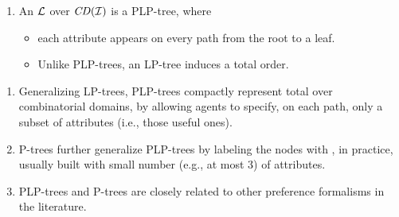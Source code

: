 {
  \begin{enumerate}
    \item An  $\mathcal{L}$ over $\mathit{CD}(\mathcal{I})$ is a PLP-tree, where
    \begin{itemize}
      \item each attribute appears  on every path from the root to a leaf.
			\item Unlike PLP-trees, an LP-tree induces a total order.
    \end{itemize}
  \end{enumerate}
}

{
  \begin{enumerate}
		\item Generalizing LP-trees, PLP-trees compactly represent total  over combinatorial
					domains, by allowing agents to specify, on each path, only a subset of attributes (i.e.,
					those useful ones).
		\item P-trees further generalize PLP-trees by labeling the nodes with ,
					in practice, usually built with small number (e.g., at most 3) of attributes.
		\item PLP-trees and P-trees are closely related to other preference formalisms
					in the literature.
  \end{enumerate}
}
